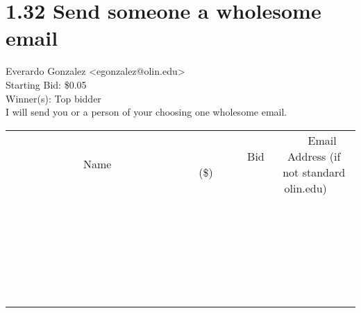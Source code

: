 \documentclass[11pt]{article}
\begin{document}
					\section*{1.32 Send someone a wholesome email}
					Everardo Gonzalez <egonzalez@olin.edu> \\
					Starting Bid: \$0.05 \\
					Winner(s): Top bidder \\
					I will send you or a person of your choosing one wholesome email. \\
					[6ex]
					\begin{tabular}{c c c}
						~~~~~~~~~~~~~Name~~~~~~~~~~~~~ & ~~~~~~~~~Bid (\$)~~~~~~~~~ & ~~~Email Address (if not standard olin.edu)~~~ \\
				
 & & \\
\hline
 & & \\
\hline
 & & \\
\hline
 & & \\
\hline
 & & \\
\hline
 & & \\
\hline
 & & \\
\hline
 & & \\
\hline
 & & \\
\hline
 & & \\
\hline
 & & \\
\hline
 & & \\
\hline
 & & \\
\hline
 & & \\
\hline
 & & \\
\hline
 & & \\
\hline
 & & \\
\hline
 & & \\
\hline
 & & \\
\hline
 & & \\
\hline
 & & \\
\hline
 & & \\
\hline
 & & \\
\hline
 & & \\
\hline
 & & \\
\hline
 & & \\
\hline
					\end{tabular}
					\clearpage
				
\end{document}
